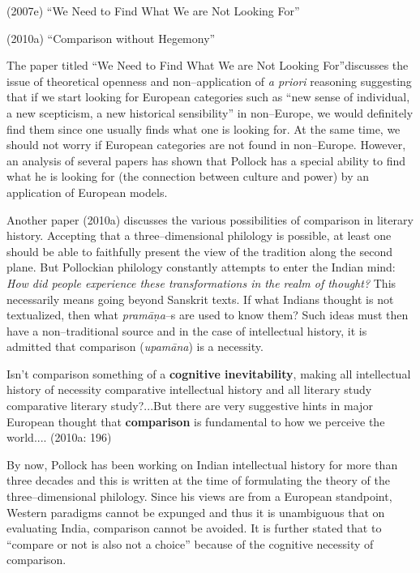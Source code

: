 \item (2007e) “We Need to Find What We are Not Looking For”

 \item (2010a) “Comparison without Hegemony”

The paper titled “We Need to Find What We are Not Looking For”discusses the issue of theoretical openness and non–application of \textit{a priori} reasoning suggesting that if we start looking for European categories such as “new sense of individual, a new scepticism, a new historical sensibility” in non–Europe, we would definitely find them since one usually finds what one is looking for. At the same time, we should not worry if European categories are not found in non–Europe. However, an analysis of several papers has shown that Pollock has a special ability to find what he is looking for (the connection between culture and power) by an application of European models.

Another paper (2010a) discusses the various possibilities of comparison in literary history. Accepting that a three–dimensional philology is possible, at least one should be able to faithfully present the view of the tradition along the second plane. But Pollockian philology constantly attempts to enter the Indian mind:\textit{ How did people experience these transformations in the realm of thought?} This necessarily means going beyond Sanskrit texts. If what Indians thought is not textualized, then what \textit{pramāṇa}–s are used to know them? Such ideas must then have a non–traditional source and in the case of intellectual history, it is admitted that comparison (\textit{upamāna}) is a necessity.

\begin{myquote}
Isn’t comparison something of a \textbf{cognitive inevitability}, making all intellectual history of necessity comparative intellectual history and all literary study comparative literary study?...But there are very suggestive hints in major European thought that \textbf{comparison} is fundamental to how we perceive the world.... (2010a: 196)
\end{myquote}

By now, Pollock has been working on Indian intellectual history for more than three decades and this is written at the time of formulating the theory of the three–dimensional philology. Since his views are from a European standpoint, Western paradigms cannot be expunged and thus it is unambiguous that on evaluating India, comparison cannot be avoided. It is further stated that to “compare or not is also not a choice” because of the cognitive necessity of comparison.

